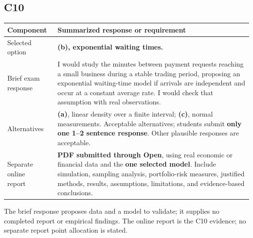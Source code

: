 \subsection*{C10}
\par\smallskip
\begin{tabularx}{\linewidth}{@{}p{3.1cm} >{\raggedright\arraybackslash}X@{}}
\toprule
Component & Summarized response or requirement \\
\midrule
Selected option & \textbf{(b), exponential waiting times.} \\
Brief exam response & I would study the minutes between payment requests reaching a small business during a stable trading period, proposing an exponential waiting-time model if arrivals are independent and occur at a constant average rate. I would check that assumption with real observations. \\
Alternatives & \textbf{(a)}, linear density over a finite interval; \textbf{(c)}, normal measurements. Acceptable alternatives; students submit \textbf{only one 1--2 sentence response}. Other plausible responses are acceptable. \\
\midrule
\shortstack[l]{Separate online\\report} & \textbf{PDF submitted through Open}, using real economic or financial data and the \textbf{one selected model}. Include simulation, sampling analysis, portfolio-risk measures, justified methods, results, assumptions, limitations, and evidence-based conclusions. \\
\bottomrule
\end{tabularx}
\par\smallskip
The brief response proposes data and a model to validate; it supplies no completed
report or empirical findings. The online report is the C10 evidence;
no separate report point allocation is stated.
\par
\endgroup


